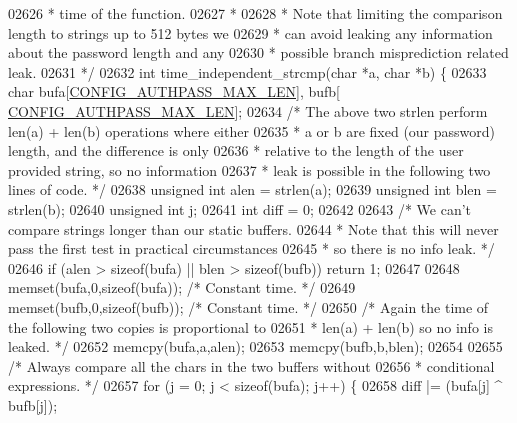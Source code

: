 \begin{DoxyCode}
{{{{{{{{{{{{{{{{{{{{{{{{{{{{{{{{{02626 \textcolor{comment}{ * time of the function.}
02627 \textcolor{comment}{ *}
02628 \textcolor{comment}{ * Note that limiting the comparison length to strings up to 512 bytes we}
02629 \textcolor{comment}{ * can avoid leaking any information about the password length and any}
02630 \textcolor{comment}{ * possible branch misprediction related leak.}
02631 \textcolor{comment}{ */}
02632 \textcolor{keywordtype}{int} time\_independent\_strcmp(\textcolor{keywordtype}{char} *a, \textcolor{keywordtype}{char} *b) \{
02633     \textcolor{keywordtype}{char} bufa[\hyperlink{server_8h_a8e9d7cd814b95c2cbd17701efe1374f2}{CONFIG\_AUTHPASS\_MAX\_LEN}], bufb[
      \hyperlink{server_8h_a8e9d7cd814b95c2cbd17701efe1374f2}{CONFIG\_AUTHPASS\_MAX\_LEN}];
02634     \textcolor{comment}{/* The above two strlen perform len(a) + len(b) operations where either}
02635 \textcolor{comment}{     * a or b are fixed (our password) length, and the difference is only}
02636 \textcolor{comment}{     * relative to the length of the user provided string, so no information}
02637 \textcolor{comment}{     * leak is possible in the following two lines of code. */}
02638     \textcolor{keywordtype}{unsigned} \textcolor{keywordtype}{int} alen = strlen(a);
02639     \textcolor{keywordtype}{unsigned} \textcolor{keywordtype}{int} blen = strlen(b);
02640     \textcolor{keywordtype}{unsigned} \textcolor{keywordtype}{int} j;
02641     \textcolor{keywordtype}{int} diff = 0;
02642 
02643     \textcolor{comment}{/* We can't compare strings longer than our static buffers.}
02644 \textcolor{comment}{     * Note that this will never pass the first test in practical circumstances}
02645 \textcolor{comment}{     * so there is no info leak. */}
02646     \textcolor{keywordflow}{if} (alen > \textcolor{keyword}{sizeof}(bufa) || blen > \textcolor{keyword}{sizeof}(bufb)) \textcolor{keywordflow}{return} 1;
02647 
02648     memset(bufa,0,\textcolor{keyword}{sizeof}(bufa));        \textcolor{comment}{/* Constant time. */}
02649     memset(bufb,0,\textcolor{keyword}{sizeof}(bufb));        \textcolor{comment}{/* Constant time. */}
02650     \textcolor{comment}{/* Again the time of the following two copies is proportional to}
02651 \textcolor{comment}{     * len(a) + len(b) so no info is leaked. */}
02652     memcpy(bufa,a,alen);
02653     memcpy(bufb,b,blen);
02654 
02655     \textcolor{comment}{/* Always compare all the chars in the two buffers without}
02656 \textcolor{comment}{     * conditional expressions. */}
02657     \textcolor{keywordflow}{for} (j = 0; j < \textcolor{keyword}{sizeof}(bufa); j++) \{
02658         diff |= (bufa[j] ^ bufb[j]);
}}}}}}}}}}}}}}}}}}}}}}}}}}}}}}}}}
\end{DoxyCode}
